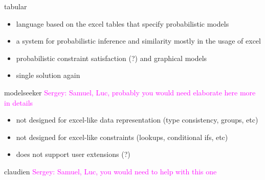 \documentclass{ecai}
\newcommand{\sergey}[1]{\textcolor{magenta}{{\sc Sergey:} #1}\xspace}
\begin{document}
tabular \cite{tabular}
\begin{itemize}
  \item language based on the excel tables that specify probabilistic models
  \item a system for probabilistic inference and similarity mostly in the usage of excel
  \item probabilistic constraint satisfaction (?) and graphical models
  \item single solution again
\end{itemize}

modelseeker \cite{modelseeker} \sergey{Samuel, Luc, probably you would need elaborate here more in details}

\begin{itemize}
  \item not designed for excel-like data representation (type consistency, groups, etc)
  \item not designed for excel-like constraints (lookups, conditional ifs, etc)
  \item does not support user extensions (?)
\end{itemize}

claudien \cite{claudien} \sergey{Samuel, Luc, you would need to help with this one}



\end{document}
